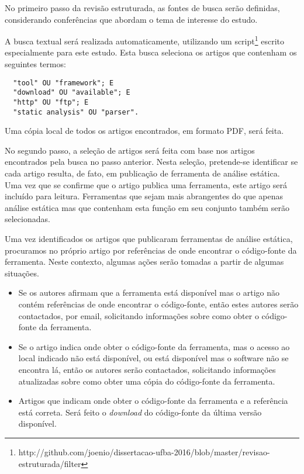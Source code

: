 No primeiro passo da revisão estruturada, as fontes de busca serão definidas,
considerando conferências que abordam o tema de interesse do estudo. 

A busca textual será realizada automaticamente, utilizando um
script\footnote{http://github.com/joenio/dissertacao-ufba-2016/blob/master/revisao-estruturada/filter}
escrito especialmente para este estudo. Esta busca seleciona os artigos que
contenham os seguintes termos:

\begin{verbatim}
  "tool" OU "framework"; E
  "download" OU "available"; E
  "http" OU "ftp"; E
  "static analysis" OU "parser".
\end{verbatim}

Uma cópia local de todos os artigos encontrados, em formato PDF, será feita.

No segundo passo, a seleção de artigos será feita com base nos artigos
encontrados pela busca no passo anterior.  Nesta seleção, pretende-se
identificar se cada artigo resulta, de fato, em publicação de ferramenta de
análise estática. Uma vez que se confirme que o artigo publica uma
ferramenta, este artigo será incluído para leitura. Ferramentas que sejam
mais abrangentes do que apenas análise estática mas que contenham esta função
em seu conjunto também serão selecionadas.

Uma vez identificados os artigos que publicaram ferramentas de análise
estática, procuramos no próprio artigo por referências de onde encontrar o
código-fonte da ferramenta. Neste contexto, algumas ações serão tomadas a
partir de algumas situações.

\begin{itemize}

  \item Se os autores afirmam que a ferramenta está disponível mas o artigo
    não contém referências de onde encontrar o código-fonte, então estes
    autores serão contactados, por email, solicitando informações sobre como
    obter o código-fonte da ferramenta.

  \item Se o artigo indica onde obter o código-fonte da ferramenta, mas o acesso ao local
    indicado não está disponível, ou está disponível mas o software não se
    encontra lá, então os autores serão contactados, solicitando informações
    atualizadas sobre como obter uma cópia do código-fonte da ferramenta.

  \item Artigos que indicam onde obter o código-fonte da ferramenta e a referência
    está correta. Será feito o {\it download} do código-fonte da última versão
    disponível.

\end{itemize}


